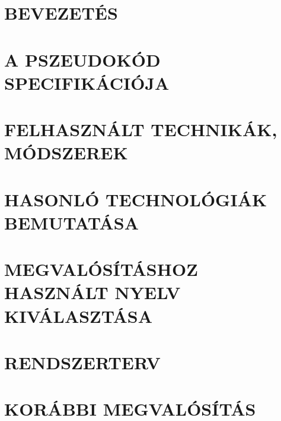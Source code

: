 \documentclass[12pt,a4paper]{article}
\begin{document}







\newpage
\tableofcontents
\newpage





\clearpage
\section{BEVEZETÉS}


\clearpage
\section{A PSZEUDOKÓD SPECIFIKÁCIÓJA}
\label{sec:specification}


\clearpage
\section{FELHASZNÁLT TECHNIKÁK, MÓDSZEREK}
\label{sec:techniques}


\clearpage
\section{HASONLÓ TECHNOLÓGIÁK BEMUTATÁSA}
\label{sec:similar}


\clearpage
\section{MEGVALÓSÍTÁSHOZ HASZNÁLT NYELV KIVÁLASZTÁSA}
\label{sec:language}


\clearpage
\section{RENDSZERTERV}
\label{sec:plan}


\clearpage
\section{KORÁBBI MEGVALÓSÍTÁS}
\label{sec:previous}

\end{document}
